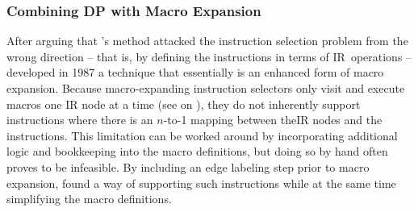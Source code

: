 \subsubsection{Combining DP with Macro Expansion}

After arguing that \citeauthor{GlanvilleGraham:1978}'s method attacked the
\gls{instruction selection} problem from the wrong direction -- that is, by
defining the \glspl{instruction} in terms of \gls{IR}~operations --
\textcite{Horspool:1987} developed in 1987 a technique that essentially is an
enhanced form of \gls{macro expansion}.
%
Because \gls{macro}-expanding \glspl{instruction selector} only visit and
execute macros one \gls{IR} \gls{node} at a time (see
 on ), they do not
inherently support \glspl{instruction} where there is an \mbox{$n$-to-1} mapping
between the\gls{IR} \glspl{node} and the \glspl{instruction}.
%
This limitation can be worked around by incorporating additional logic and
bookkeeping into the macro definitions, but doing so by hand often proves to be
infeasible.
%
By including an \gls{edge} labeling step prior to \gls{macro expansion},
\citeauthor{Horspool:1987} found a way of supporting such \glspl{instruction}
while at the same time simplifying the \gls{macro} definitions.

